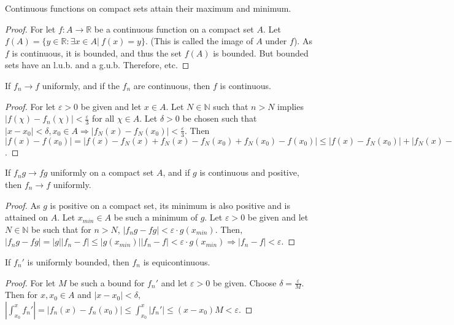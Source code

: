 \documentclass[crop=false,class=book,oneside]{standalone}
\begin{document}
            \begin{corollary}
                Continuous functions on compact sets attain their maximum and minimum.
            \end{corollary}
            \begin{proof}
                For let $f:A\rightarrow \mathbb{R}$ be a continuous function on a compact set $A$. Let $f(A) = \{y\in \mathbb{R}:\exists x\in A|\ f(x)=y\}$. (This is called the image of $A$ under $f$). As $f$ is continuous, it is bounded, and thus the set $f(A)$ is bounded. But bounded sets have an l.u.b. and a g.u.b. Therefore, etc.
            \end{proof}
            \begin{lemma}
                If $f_n\rightarrow f$ uniformly, and if the $f_n$ are continuous, then $f$ is continuous.
            \end{lemma}
            \begin{proof}
                For let $\varepsilon>0$ be given and let $x\in A$. Let $N\in \mathbb{N}$ such that $n>N$ implies $|f(\chi)-f_n(\chi)|<\frac{\varepsilon}{3}$ for all $\chi\in A$. Let $\delta>0$ be chosen such that $|x-x_0|<\delta, x_0\in A\Rightarrow |f_N(x)-f_N(x_0)|<\frac{\varepsilon}{3}$. Then  $|f(x)-f(x_0)|=|f(x)-f_N(x)+f_N(x)-f_N(x_0)+f_N(x_0)-f(x_0)|\leq |f(x)-f_N(x_0)|+|f_N(x)-f_N(x_0)|+|f(x_0)-f_N(x_0)|<\varepsilon$.
            \end{proof}
            \begin{theorem}
                If $f_ng\rightarrow fg$ uniformly on a compact set $A$, and if $g$ is continuous and positive, then $f_n\rightarrow f$ uniformly.
            \end{theorem}
            \begin{proof}
                As $g$ is positive on a compact set, its minimum is also positive and is attained on $A$. Let $x_{min}\in A$ be such a minimum of $g$. Let $\varepsilon>0$ be given and let $N\in \mathbb{N}$ be such that for $n>N$, $|f_ng-fg|<\varepsilon\cdot g(x_{min})$. Then, $|f_ng-fg|=|g||f_n-f|\leq |g(x_{min})||f_n-f|<\varepsilon \cdot g(x_{min})\Rightarrow |f_n-f|<\varepsilon$.
            \end{proof}
            \begin{lemma}
                If $f_n'$ is uniformly bounded, then $f_n$ is equicontinuous.
            \end{lemma}
            \begin{proof}
                For let $M$ be such a bound for $f_n'$ and let $\varepsilon>0$ be given. Choose $\delta = \frac{\varepsilon}{M}$. Then for $x,x_0\in A$ and $|x-x_0|<\delta$, $|\int_{x_0}^{x}f_n'| =|f_n(x)-f_n(x_0)| \leq \int_{x_0}^{x}|f_n'| \leq (x-x_0)M < \varepsilon$.
            \end{proof}
\end{document}
